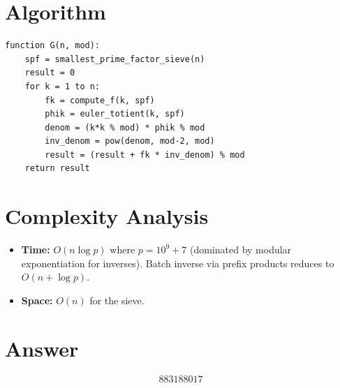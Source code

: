 \documentclass[11pt]{article}
\begin{document}
\section{Algorithm}

\begin{verbatim}
function G(n, mod):
    spf = smallest_prime_factor_sieve(n)
    result = 0
    for k = 1 to n:
        fk = compute_f(k, spf)
        phik = euler_totient(k, spf)
        denom = (k*k % mod) * phik % mod
        inv_denom = pow(denom, mod-2, mod)
        result = (result + fk * inv_denom) % mod
    return result
\end{verbatim}

\section{Complexity Analysis}

\begin{itemize}
    \item \textbf{Time:} $O(n \log p)$ where $p = 10^9+7$ (dominated by modular exponentiation for inverses). Batch inverse via prefix products reduces to $O(n + \log p)$.
    \item \textbf{Space:} $O(n)$ for the sieve.
\end{itemize}

\section{Answer}

\[
\boxed{883188017}
\]
\end{document}
